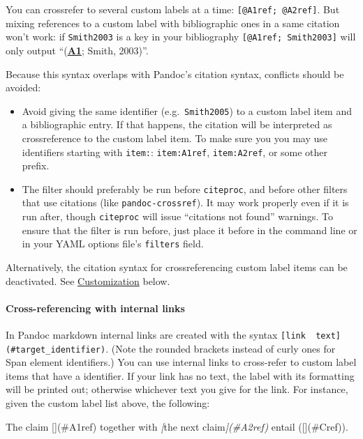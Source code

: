 \documentclass[
]{article}
\newenvironment{Shaded}{}{}
\newcommand{\CommentTok}[1]{\textcolor[rgb]{0.38,0.63,0.69}{\textit{#1}}}
\newcommand{\NormalTok}[1]{#1}
\newcommand{\OtherTok}[1]{\textcolor[rgb]{0.00,0.44,0.13}{#1}}
\providecommand{\tightlist}{%
  \setlength{\itemsep}{0pt}\setlength{\parskip}{0pt}}
\begin{document}
You can crossrefer to several custom labels at a time:
\texttt{{[}@A1ref;\ @A2ref{]}}. But mixing references to a custom label
with bibliographic ones in a same citation won't work: if
\texttt{Smith2003} is a key in your bibliography
\texttt{{[}@A1ref;\ Smith2003{]}} will only output
``(\protect\hyperlink{A1ref}{\textbf{A1}}; Smith, 2003)''.

Because this syntax overlaps with Pandoc's citation syntax, conflicts
should be avoided:

\begin{itemize}
\tightlist
\item
  Avoid giving the same identifier (e.g.~\texttt{Smith2005}) to a custom
  label item and a bibliographic entry. If that happens, the citation
  will be interpreted as crossreference to the custom label item. To
  make sure you you may use identifiers starting with \texttt{item:}:
  \texttt{item:A1ref}, \texttt{item:A2ref}, or some other prefix.
\item
  The filter should preferably be run before \texttt{citeproc}, and
  before other filters that use citations (like
  \texttt{pandoc-crossref}). It may work properly even if it is run
  after, though \texttt{citeproc} will issue ``citations not found''
  warnings. To ensure that the filter is run before, just place it
  before in the command line or in your YAML options file's
  \texttt{filters} field.
\end{itemize}

Alternatively, the citation syntax for crossreferencing custom label
items can be deactivated. See
\protect\hyperlink{customization}{Customization} below.

\hypertarget{cross-referencing-with-internal-links}{%
\paragraph{Cross-referencing with internal
links}\label{cross-referencing-with-internal-links}}

In Pandoc markdown internal links are created with the syntax
\texttt{{[}link\ \ text{]}(\#target\_identifier)}. (Note the rounded
brackets instead of curly ones for Span element identifiers.) You can
use internal links to cross-refer to custom label items that have a
identifier. If your link has no text, the label with its formatting will
be printed out; otherwise whichever text you give for the link. For
instance, given the custom label list above, the following:

\begin{Shaded}
\begin{Highlighting}[]
\NormalTok{The claim [](\#A1ref) together with }\CommentTok{[}\OtherTok{the next claim}\CommentTok{](\#A2ref)} 
\NormalTok{entail ([](\#Cref)).}
\end{Highlighting}
\end{Shaded}
\end{document}
